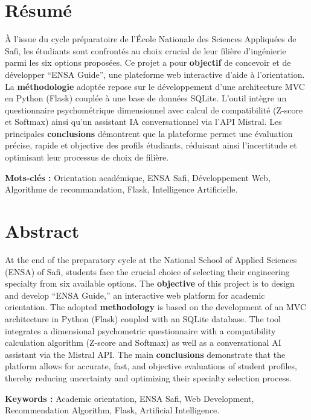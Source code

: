 \documentclass[a4paper,12pt]{article}
\begin{document}
\section*{\Huge{Résumé}}
\vspace{1cm}
{\large
À l'issue du cycle préparatoire de l'École Nationale des Sciences Appliquées de Safi, les étudiants sont confrontés au choix crucial de leur filière d'ingénierie parmi les six options proposées. Ce projet a pour \textbf{objectif} de concevoir et de développer \enquote{ENSA Guide}, une plateforme web interactive d'aide à l'orientation. La \textbf{méthodologie} adoptée repose sur le développement d'une architecture MVC en Python (Flask) couplée à une base de données SQLite. L'outil intègre un questionnaire psychométrique dimensionnel avec calcul de compatibilité (Z-score et Softmax) ainsi qu'un assistant IA conversationnel via l'API Mistral. Les principales \textbf{conclusions} démontrent que la plateforme permet une évaluation précise, rapide et objective des profils étudiants, réduisant ainsi l'incertitude et optimisant leur processus de choix de filière.

\vspace{0.5cm}
\textbf{Mots-clés :} Orientation académique, ENSA Safi, Développement Web, Algorithme de recommandation, Flask, Intelligence Artificielle.
}

\newpage
{}
\section*{\Huge{Abstract}}
\vspace{1cm}
{\large
At the end of the preparatory cycle at the National School of Applied Sciences (ENSA) of Safi, students face the crucial choice of selecting their engineering specialty from six available options. The \textbf{objective} of this project is to design and develop \enquote{ENSA Guide,} an interactive web platform for academic orientation. The adopted \textbf{methodology} is based on the development of an MVC architecture in Python (Flask) coupled with an SQLite database. The tool integrates a dimensional psychometric questionnaire with a compatibility calculation algorithm (Z-score and Softmax) as well as a conversational AI assistant via the Mistral API. The main \textbf{conclusions} demonstrate that the platform allows for accurate, fast, and objective evaluations of student profiles, thereby reducing uncertainty and optimizing their specialty selection process.

\vspace{0.5cm}
\textbf{Keywords :} Academic orientation, ENSA Safi, Web Development, Recommendation Algorithm, Flask, Artificial Intelligence.
}
\end{document}
